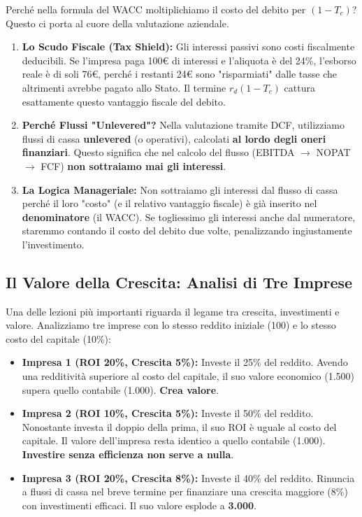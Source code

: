 \documentclass[a4paper,10pt]{article}
\begin{document}
Perché nella formula del WACC moltiplichiamo il costo del debito per $(1 - T_c)$? Questo ci porta al cuore della valutazione aziendale.

\begin{enumerate}
    \item \textbf{Lo Scudo Fiscale (Tax Shield):} Gli interessi passivi sono costi fiscalmente deducibili. Se l'impresa paga 100€ di interessi e l'aliquota è del 24\%, l'esborso reale è di soli 76€, perché i restanti 24€ sono "risparmiati" dalle tasse che altrimenti avrebbe pagato allo Stato. Il termine $r_d(1-T_c)$ cattura esattamente questo vantaggio fiscale del debito.
    \item \textbf{Perché Flussi "Unlevered"?} Nella valutazione tramite DCF, utilizziamo flussi di cassa \textbf{unlevered} (o operativi), calcolati \textbf{al lordo degli oneri finanziari}. Questo significa che nel calcolo del flusso (EBITDA $\rightarrow$ NOPAT $\rightarrow$ FCF) \textbf{non sottraiamo mai gli interessi}.
    \item \textbf{La Logica Manageriale:} Non sottraiamo gli interessi dal flusso di cassa perché il loro "costo" (e il relativo vantaggio fiscale) è già inserito nel \textbf{denominatore} (il WACC). Se togliessimo gli interessi anche dal numeratore, staremmo contando il costo del debito due volte, penalizzando ingiustamente l'investimento.
\end{enumerate}
\subsection*{Il Valore della Crescita: Analisi di Tre Imprese}

Una delle lezioni più importanti riguarda il legame tra crescita, investimenti e valore. Analizziamo tre imprese con lo stesso reddito iniziale (100) e lo stesso costo del capitale (10\%):

\begin{itemize}
    \item \textbf{Impresa 1 (ROI 20\%, Crescita 5\%):} Investe il 25\% del reddito. Avendo una redditività superiore al costo del capitale, il suo valore economico (1.500) supera quello contabile (1.000). \textbf{Crea valore}.
    \item \textbf{Impresa 2 (ROI 10\%, Crescita 5\%):} Investe il 50\% del reddito. Nonostante investa il doppio della prima, il suo ROI è uguale al costo del capitale. Il valore dell'impresa resta identico a quello contabile (1.000). \textbf{Investire senza efficienza non serve a nulla}.
    \item \textbf{Impresa 3 (ROI 20\%, Crescita 8\%):} Investe il 40\% del reddito. Rinuncia a flussi di cassa nel breve termine per finanziare una crescita maggiore (8\%) con investimenti efficaci. Il suo valore esplode a \textbf{3.000}.
\end{itemize}
\end{document}
